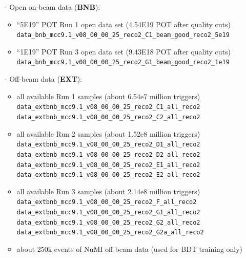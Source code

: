 \begin{itemize}
\item[-] Open on-beam data (\textbf{BNB}):
\begin{itemize}
\item ``5E19'' POT Run 1 open data set (4.54E19 POT after quality cuts)  \newline \texttt{data\_bnb\_mcc9.1\_v08\_00\_00\_25\_reco2\_C1\_beam\_good\_reco2\_5e19}
\item  ``1E19'' POT Run 3 open data set  (9.43E18 POT after quality cuts) \newline \texttt{data\_bnb\_mcc9.1\_v08\_00\_00\_25\_reco2\_G1\_beam\_good\_reco2\_1e19}
\end{itemize}
\item[-] Off-beam data (\textbf{EXT}):
\begin{itemize}
\item all available Run 1 samples (about 6.54e7 million triggers) \newline
\texttt{data\_extbnb\_mcc9.1\_v08\_00\_00\_25\_reco2\_C1\_all\_reco2} \newline
\texttt{data\_extbnb\_mcc9.1\_v08\_00\_00\_25\_reco2\_C2\_all\_reco2} \newline
\item all available Run 2 samples (about 1.52e8 million triggers) \newline 
\texttt{data\_extbnb\_mcc9.1\_v08\_00\_00\_25\_reco2\_D1\_all\_reco2} \newline
\texttt{data\_extbnb\_mcc9.1\_v08\_00\_00\_25\_reco2\_D2\_all\_reco2} \newline
\texttt{data\_extbnb\_mcc9.1\_v08\_00\_00\_25\_reco2\_E1\_all\_reco2} \newline
\texttt{data\_extbnb\_mcc9.1\_v08\_00\_00\_25\_reco2\_E2\_all\_reco2} \newline
\item all available Run 3 samples (about 2.14e8 million triggers) \newline
\texttt{data\_extbnb\_mcc9.1\_v08\_00\_00\_25\_reco2\_F\_all\_reco2} \newline 
\texttt{data\_extbnb\_mcc9.1\_v08\_00\_00\_25\_reco2\_G1\_all\_reco2} \newline
\texttt{data\_extbnb\_mcc9.1\_v08\_00\_00\_25\_reco2\_G2\_all\_reco2} \newline
\texttt{data\_extbnb\_mcc9.1\_v08\_00\_00\_25\_reco2\_G2a\_all\_reco2} \newline
\item about 250k events of NuMI off-beam data (used for BDT training only)

\end{itemize}
\end{itemize}
